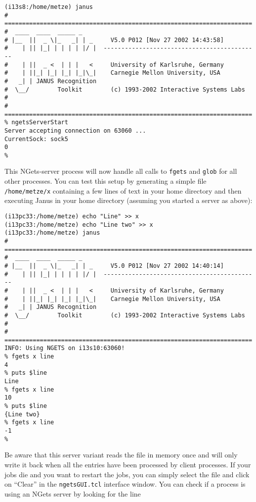 \begin{verbatim}
(i13s8:/home/metze) janus
# ======================================================================
#  ____  ____  _____ _                                                  
# |__  ||  _ \|_   _| | _     V5.0 P012 [Nov 27 2002 14:43:58]
#    | || |_| | | | | |/ |  --------------------------------------------
#    | ||  _ <  | | |   <     University of Karlsruhe, Germany            
#    | ||_| |_| |_| |_|\_|    Carnegie Mellon University, USA            
#   _| | JANUS Recognition                                              
#  \__/        Toolkit        (c) 1993-2002 Interactive Systems Labs   
#                                                                       
# ======================================================================
% ngetsServerStart
Server accepting connection on 63060 ...
CurrentSock: sock5
0
%
\end{verbatim}

This NGets-server process will now  handle all calls to \texttt{fgets}
and \texttt{glob} for all other processes.  You can test this setup by
generating a simple file \texttt{/home/metze/x} containing a few lines
of text in  your home directory and  then executing Janus in your home
directory (assuming you started a server as above):

\begin{verbatim}
(i13pc33:/home/metze) echo "Line" >> x
(i13pc33:/home/metze) echo "Line two" >> x
(i13pc33:/home/metze) janus
# ======================================================================
#  ____  ____  _____ _
# |__  ||  _ \|_   _| | _     V5.0 P012 [Nov 27 2002 14:40:14]
#    | || |_| | | | | |/ |  --------------------------------------------
#    | ||  _ <  | | |   <     University of Karlsruhe, Germany
#    | ||_| |_| |_| |_|\_|    Carnegie Mellon University, USA
#   _| | JANUS Recognition
#  \__/        Toolkit        (c) 1993-2002 Interactive Systems Labs
#
# ======================================================================
INFO: Using NGETS on i13s10:63060!
% fgets x line
4
% puts $line
Line
% fgets x line
10
% puts $line
{Line two}
% fgets x line
-1
%
\end{verbatim}

Be aware that this server variant reads the file in memory once and
will only write it back when all the entries have been processed by
client processes. If your jobs die and you want to restart the jobs,
you can simply select the file and click on ``Clear'' in the
\texttt{ngetsGUI.tcl} interface window. You can check if a process is
using an NGets server by looking for the line 

